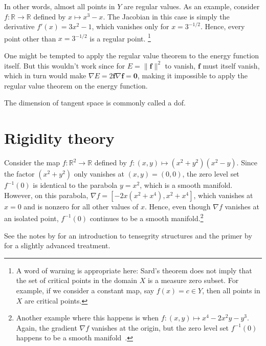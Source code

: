In other words, almost all points in $Y$ are regular values.
As an example, consider $f: \mathbb{R} \to \mathbb{R}$ defined by $x \mapsto x^3 - x$.
The Jacobian in this case is simply the derivative $f'(x) = 3x^2 - 1$, which vanishes only for $x = 3^{-1/2}$.
Hence, every point other than $x = 3^{-1/2}$ is a regular point.%
\footnote{A word of warning is appropriate here: Sard's theorem does not imply that the set of critical points in the domain $X$ is a measure zero subset.
For example, if we consider a constant map, say $f(x) = c \in Y$, then all points in $X$ are critical points.}

One might be tempted to apply the regular value theorem to the energy function itself.
But this wouldn't work since for $E=\|\bm{f}\|^2$ to vanish, $\bm{f}$ must itself vanish, which in turn would make $\nabla E = 2 \bm{f}\nabla\bm{f} = \bm{0}$, making it impossible to apply the regular value theorem on the energy function.

The dimension of tangent space is commonly called a \ac{dof}.

\begin{theorem}
\end{theorem}

\section{Rigidity theory}

\begin{example}
  Consider the map $f: \mathbb{R}^{2} \to \mathbb{R}$ defined by $f: (x, y) \mapsto (x^{2} + y^{2})(x^{2} - y)$.
  Since the factor $(x^{2} + y^{2})$ only vanishes at $(x, y) = (0, 0)$, the zero level set $f^{-1}(0)$ is identical to the parabola $y = x^{2}$, which is a smooth manifold.
  However, on this parabola, $\nabla f = [-2x(x^{2} + x^{4}), x^{2} + x^{4}]$, which vanishes at $x = 0$ and is nonzero for all other values of $x$.
Hence, even though $\nabla f$ vanishes at an isolated point, $f^{-1}(0)$ continues to be a smooth manifold.\footnote{Another example where this happens is when $f: (x, y) \mapsto x^{4} - 2x^{2}y - y^{3}$. Again, the gradient $\nabla f$ vanishes at the origin, but the zero level set $f^{-1}(0)$ happens to be a smooth manifold~\cite[Examples 1.1, (vi)]{diesse2020}.}
\altqed
\end{example}

See the notes by \citet{connelly2015} for an introduction to tensegrity structures and the primer by \citet{williams2003} for a slightly advanced treatment.

